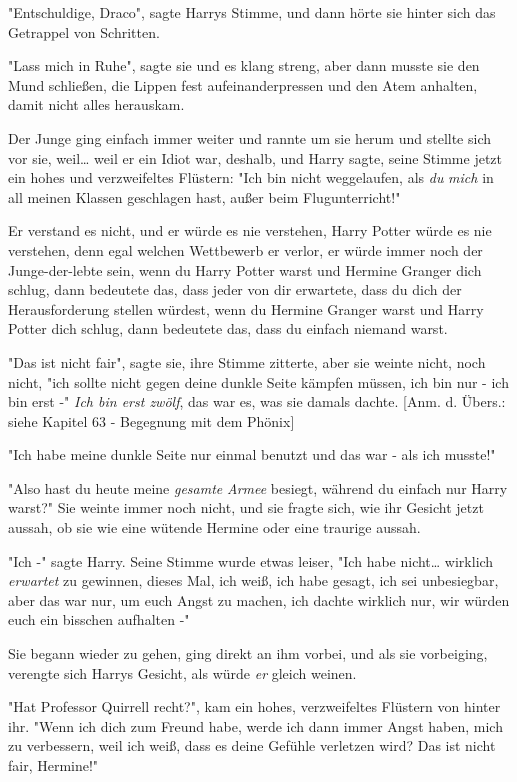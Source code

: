 {"Entschuldige, Draco", sagte Harrys Stimme, und dann hörte sie hinter sich das Getrappel von Schritten.

"Lass mich in Ruhe", sagte sie und es klang streng, aber dann musste sie den Mund schließen, die Lippen fest aufeinanderpressen und den Atem anhalten, damit nicht alles herauskam.

Der Junge ging einfach immer weiter und rannte um sie herum und stellte sich vor sie, weil… weil er ein Idiot war, deshalb, und Harry sagte, seine Stimme jetzt ein hohes und verzweifeltes Flüstern: "Ich bin nicht weggelaufen, als \emph{du} \emph{mich} in all meinen Klassen geschlagen hast, außer beim Flugunterricht!"

Er verstand es nicht, und er würde es nie verstehen, Harry Potter würde es nie verstehen, denn egal welchen Wettbewerb er verlor, er würde immer noch der Junge-der-lebte sein, wenn du Harry Potter warst und Hermine Granger dich schlug, dann bedeutete das, dass jeder von dir erwartete, dass du dich der Herausforderung stellen würdest, wenn du Hermine Granger warst und Harry Potter dich schlug, dann bedeutete das, dass du einfach niemand warst.

"Das ist nicht fair", sagte sie, ihre Stimme zitterte, aber sie weinte nicht, noch nicht, "ich sollte nicht gegen deine dunkle Seite kämpfen müssen, ich bin nur - ich bin erst -" \emph{Ich bin erst zwölf}, das war es, was sie damals dachte. {[}Anm. d. Übers.: siehe Kapitel 63 - Begegnung mit dem Phönix{]}

"Ich habe meine dunkle Seite nur einmal benutzt und das war - als ich musste!"

"Also hast du heute meine \emph{gesamte} \emph{Armee} besiegt, während du einfach nur Harry warst?" Sie weinte immer noch nicht, und sie fragte sich, wie ihr Gesicht jetzt aussah, ob sie wie eine wütende Hermine oder eine traurige aussah.

"Ich -" sagte Harry. Seine Stimme wurde etwas leiser, "Ich habe nicht… wirklich \emph{erwartet} zu gewinnen, dieses Mal, ich weiß, ich habe gesagt, ich sei unbesiegbar, aber das war nur, um euch Angst zu machen, ich dachte wirklich nur, wir würden euch ein bisschen aufhalten -"

Sie begann wieder zu gehen, ging direkt an ihm vorbei, und als sie vorbeiging, verengte sich Harrys Gesicht, als würde \emph{er} gleich weinen.

"Hat Professor Quirrell recht?", kam ein hohes, verzweifeltes Flüstern von hinter ihr. "Wenn ich dich zum Freund habe, werde ich dann immer Angst haben, mich zu verbessern, weil ich weiß, dass es deine Gefühle verletzen wird? Das ist nicht fair, Hermine!"

}
